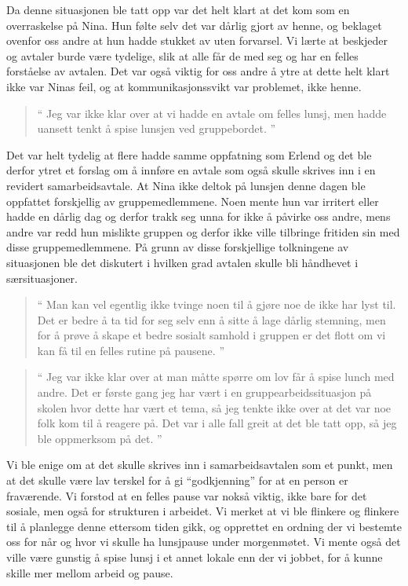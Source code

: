 Da denne situasjonen ble tatt opp var det helt klart at det kom som en overraskelse på Nina. Hun følte selv det var dårlig gjort av henne, og beklaget ovenfor oss andre at hun hadde stukket av uten forvarsel. Vi lærte at beskjeder og avtaler burde være tydelige, slik at alle får de med seg og har en felles forståelse av avtalen. Det var også viktig for oss andre å ytre at dette helt klart ikke var Ninas feil, og at kommunikasjonssvikt var problemet, ikke henne. 

\begin{quote}``
Jeg var ikke klar over at vi hadde en avtale om felles lunsj, men hadde uansett tenkt å spise lunsjen ved gruppebordet.
''\end{quote} 

Det var helt tydelig at flere hadde samme oppfatning som Erlend og det ble derfor ytret et forslag om å innføre en avtale som også skulle skrives inn i en revidert samarbeidsavtale. At Nina ikke deltok på lunsjen denne dagen ble oppfattet forskjellig av gruppemedlemmene. Noen mente hun var irritert eller hadde en dårlig dag og derfor trakk seg unna for ikke å påvirke oss andre, mens andre var redd hun mislikte gruppen og derfor ikke ville tilbringe fritiden sin med disse gruppemedlemmene. På grunn av disse forskjellige tolkningene av situasjonen ble det diskutert i hvilken grad avtalen skulle bli håndhevet i særsituasjoner. 

\begin{quote}``
Man kan vel egentlig ikke tvinge noen til å gjøre noe de ikke har lyst til. Det er bedre å ta tid for seg selv enn å sitte å lage dårlig stemning, men for å prøve å skape et bedre sosialt samhold i gruppen er det flott om vi kan få til en felles rutine på pausene.
''\end{quote} 

\begin{quote}``
Jeg var ikke klar over at man måtte spørre om lov får å spise lunch med andre. Det er første gang jeg har vært i en gruppearbeidssituasjon på skolen hvor dette har vært et tema, så jeg tenkte ikke over at det var noe folk kom til å reagere på. Det var i alle fall greit at det ble tatt opp, så jeg ble oppmerksom på det.
''\end{quote} 

Vi ble enige om at det skulle skrives inn i samarbeidsavtalen som et punkt, men at det skulle være lav terskel for å gi ``godkjenning'' for at en person er fraværende. Vi forstod at en felles pause var nokså viktig, ikke bare for det sosiale, men også for strukturen i arbeidet. Vi merket at vi ble flinkere og flinkere til å planlegge denne ettersom tiden gikk, og opprettet en ordning der vi bestemte oss for når og hvor vi skulle ha lunsjpause under morgenmøtet. Vi mente også det ville være gunstig å spise lunsj i et annet lokale enn der vi jobbet, for å kunne skille mer mellom arbeid og pause.

